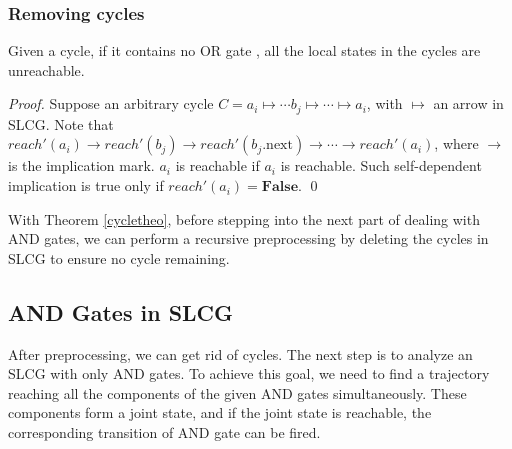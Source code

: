 \documentclass[runningheads]{llncs}
\begin{document}
\subsubsection{Removing cycles}
\begin{theorem}\label{cycletheo}
Given a cycle, if it contains no OR gate%
, all the local states in the cycles are unreachable.
\end{theorem}

\begin{proof}
Suppose an arbitrary cycle $C=a_i\mapsto \cdots b_j\mapsto\cdots \mapsto a_i$, with $\mapsto$ an arrow in SLCG. Note that $reach'(a_i)\to reach'(b_j)\to reach'(b_j.\text{next})\to\cdots\to reach'(a_i)$, where $\to$ is the implication mark. $a_i$ is reachable if $a_i$ is reachable. Such self-dependent implication is true only if $reach'(a_i)=\mathbf{False}$.
\qed
\end{proof}



With Theorem \ref{cycletheo}, before stepping into the next part of dealing with AND gates, we can perform a recursive preprocessing by deleting the cycles in SLCG to ensure no cycle remaining.

\subsection{AND Gates in SLCG}\label{sectAndGates}
After preprocessing, we can get rid of cycles.
The next step is to analyze an SLCG with only AND gates.
To achieve this goal, we need to find a trajectory reaching all the components of the given AND gates simultaneously.
These components form a joint state, and if the joint state is reachable, the corresponding transition of AND gate can be fired. 
\end{document}
